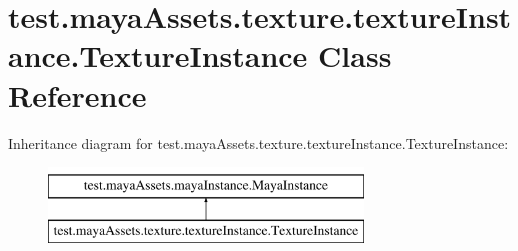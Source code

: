 \hypertarget{classtest_1_1mayaAssets_1_1texture_1_1textureInstance_1_1TextureInstance}{\section{test.\-maya\-Assets.\-texture.\-texture\-Instance.\-Texture\-Instance \-Class \-Reference}
\label{d9/db9/classtest_1_1mayaAssets_1_1texture_1_1textureInstance_1_1TextureInstance}
}
\-Inheritance diagram for test.\-maya\-Assets.\-texture.\-texture\-Instance.\-Texture\-Instance\-:\begin{figure}[H]
\begin{center}
\leavevmode
\includegraphics[height=2.000000cm]{d9/db9/classtest_1_1mayaAssets_1_1texture_1_1textureInstance_1_1TextureInstance}
\end{center}
\end{figure}
